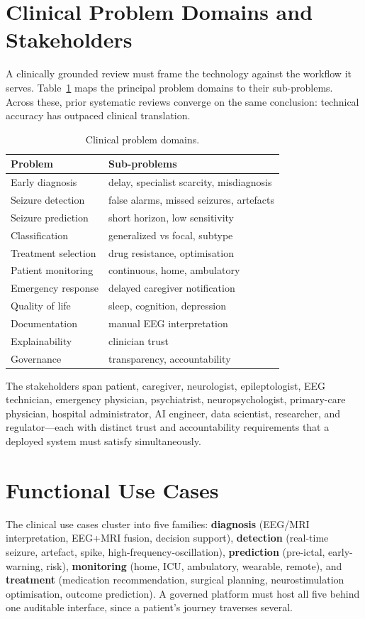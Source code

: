 \section{Clinical Problem Domains and Stakeholders}
A clinically grounded review must frame the technology against the workflow it serves. Table~\ref{tab:probdom} maps the principal problem domains to their sub-problems. Across these, prior systematic reviews \citep{rev_frontiers25,rev_seizpred25,rev_prisma26,einshoka23,amrani21,yuan22} converge on the same conclusion: technical accuracy has outpaced clinical translation.
\begin{table}[t]\centering\caption{Clinical problem domains.}\label{tab:probdom}
\footnotesize\begin{tabular}{ll}\toprule
Problem & Sub-problems\\\midrule
Early diagnosis & delay, specialist scarcity, misdiagnosis\\
Seizure detection & false alarms, missed seizures, artefacts\\
Seizure prediction & short horizon, low sensitivity\\
Classification & generalized vs focal, subtype\\
Treatment selection & drug resistance, optimisation\\
Patient monitoring & continuous, home, ambulatory\\
Emergency response & delayed caregiver notification\\
Quality of life & sleep, cognition, depression\\
Documentation & manual EEG interpretation\\
Explainability & clinician trust\\
Governance & transparency, accountability\\\bottomrule
\end{tabular}\end{table}
The stakeholders span patient, caregiver, neurologist, epileptologist, EEG technician, emergency physician, psychiatrist, neuropsychologist, primary-care physician, hospital administrator, AI engineer, data scientist, researcher, and regulator---each with distinct trust and accountability requirements that a deployed system must satisfy simultaneously.

\section{Functional Use Cases}
The clinical use cases cluster into five families: \textbf{diagnosis} (EEG/MRI interpretation, EEG+MRI fusion, decision support), \textbf{detection} (real-time seizure, artefact, spike, high-frequency-oscillation), \textbf{prediction} (pre-ictal, early-warning, risk), \textbf{monitoring} (home, ICU, ambulatory, wearable, remote), and \textbf{treatment} (medication recommendation, surgical planning, neurostimulation optimisation, outcome prediction). A governed platform must host all five behind one auditable interface, since a patient's journey traverses several.

